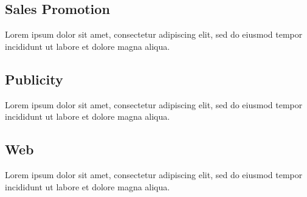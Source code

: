 \subsection{Sales Promotion}

Lorem ipsum dolor sit amet, consectetur adipiscing elit, sed do eiusmod tempor incididunt ut labore et dolore magna aliqua.

\subsection{Publicity}

Lorem ipsum dolor sit amet, consectetur adipiscing elit, sed do eiusmod tempor incididunt ut labore et dolore magna aliqua.

\subsection{Web}

Lorem ipsum dolor sit amet, consectetur adipiscing elit, sed do eiusmod tempor incididunt ut labore et dolore magna aliqua.
